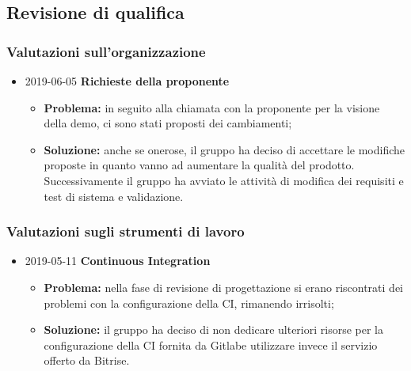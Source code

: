 \newpage
\subsection{Revisione di qualifica}
\subsubsection{Valutazioni sull'organizzazione}
\begin{itemize}	
		\item 2019-06-05 \textbf{Richieste della proponente} \\
		\begin{itemize}
			\item \textbf{Problema:} in seguito alla chiamata con la proponente per la visione della demo, ci sono stati proposti dei cambiamenti;
			\item \textbf{Soluzione:} anche se onerose, il gruppo ha deciso di accettare le modifiche proposte in quanto vanno ad aumentare la qualità del prodotto. Successivamente il gruppo ha avviato le attività di modifica dei requisiti e test di sistema e validazione.
		\end{itemize}
	
\end{itemize}
\subsubsection{Valutazioni sugli strumenti di lavoro}
\begin{itemize}
					
		\item 2019-05-11 \textbf{Continuous Integration} \\
		\begin{itemize}
			\item \textbf{Problema:} nella fase di revisione di progettazione si erano riscontrati dei problemi con la configurazione della CI, rimanendo irrisolti;
			\item \textbf{Soluzione:} il gruppo ha deciso di non dedicare ulteriori risorse per la configurazione della CI fornita da Gitlab\glosp e utilizzare invece il servizio offerto da Bitrise\glo.
		\end{itemize}
\end{itemize}